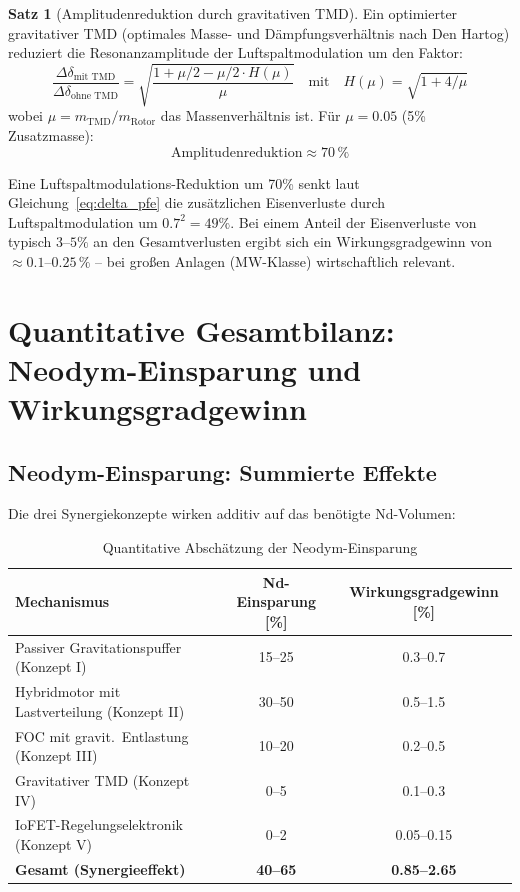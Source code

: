 ﻿\documentclass[12pt, a4paper]{report}
\theoremstyle{definition}
\newtheorem{theorem}{Satz}[section]
\theoremstyle{remark}
\begin{document}
\begin{theorem}[Amplitudenreduktion durch gravitativen TMD]
  \label{thm:TMD}
  Ein optimierter gravitativer TMD (optimales Masse- und Dämpfungsverhältnis
  nach Den Hartog) reduziert die Resonanzamplitude der Luftspaltmodulation um den
  Faktor:
  \begin{equation}
    \frac{\Delta\delta_{\text{mit TMD}}}{\Delta\delta_{\text{ohne TMD}}}
    = \sqrt{\frac{1+\mu/2 - \mu/2\cdot H(\mu)}{\mu}}
    \quad\text{mit}\quad
    H(\mu) = \sqrt{1 + 4/\mu}
    \label{eq:TMD_amplitudenred}
  \end{equation}
  wobei $\mu = m_\text{TMD}/m_{\text{Rotor}}$ das Massenverhältnis ist.
  Für $\mu = 0.05$ (5\% Zusatzmasse):
  \begin{equation}
    \text{Amplitudenreduktion} \approx 70\,\%
    \label{eq:TMD_70}
  \end{equation}
\end{theorem}

Eine Luftspaltmodulations-Reduktion um 70\% senkt laut Gleichung~\eqref{eq:delta_pfe}
die zusätzlichen Eisenverluste durch Luftspaltmodulation um $0.7^2 = 49\%$. Bei einem Anteil der
Eisenverluste von typisch $3$--$5\%$ an den Gesamtverlusten ergibt sich ein
Wirkungsgradgewinn von $\approx 0.1$--$0.25\,\%$ -- bei großen Anlagen (MW-Klasse)
wirtschaftlich relevant.

\section{Quantitative Gesamtbilanz: Neodym-Einsparung und Wirkungsgradgewinn}
\label{ssec:gesamtbilanz}

\subsection{Neodym-Einsparung: Summierte Effekte}

Die drei Synergiekonzepte wirken additiv auf das benötigte Nd-Volumen:

\begin{table}
  \centering
  \caption{Quantitative Abschätzung der Neodym-Einsparung}
  \label{tab:nd_einsparung}
  \begin{tabular}{lcc}
    \toprule
    \textbf{Mechanismus} & \textbf{Nd-Einsparung [\%]} & \textbf{Wirkungsgrad\-gewinn [\%]} \\
    \midrule
    Passiver Gravitationspuffer (Konzept I)    & 15--25 & 0.3--0.7 \\
    Hybridmotor mit Lastverteilung (Konzept II) & 30--50 & 0.5--1.5 \\
    FOC mit gravit.\ Entlastung (Konzept III)   & 10--20 & 0.2--0.5 \\
    Gravitativer TMD (Konzept IV)               & 0--5   & 0.1--0.3 \\
    IoFET-Regelungselektronik (Konzept V)       & 0--2   & 0.05--0.15 \\
    \midrule
    \textbf{Gesamt (Synergieeffekt)}            & \textbf{40--65} & \textbf{0.85--2.65} \\
    \bottomrule
  \end{tabular}
\end{table}
\end{document}
